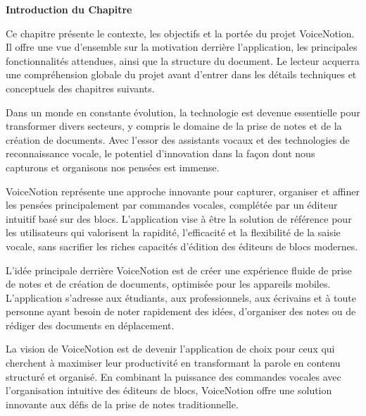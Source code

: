 
\begin{center}
\textbf{\large Introduction du Chapitre}
\end{center}

\noindent
Ce chapitre présente le contexte, les objectifs et la portée du projet VoiceNotion. Il offre une vue d'ensemble sur la motivation derrière l'application, les principales fonctionnalités attendues, ainsi que la structure du document. Le lecteur acquerra une compréhension globale du projet avant d'entrer dans les détails techniques et conceptuels des chapitres suivants.

\thispagestyle{fancy}

\vspace{1cm}

Dans un monde en constante évolution, la technologie est devenue essentielle pour transformer divers secteurs, y compris le domaine de la prise de notes et de la création de documents. Avec l'essor des assistants vocaux et des technologies de reconnaissance vocale, le potentiel d'innovation dans la façon dont nous capturons et organisons nos pensées est immense.

VoiceNotion représente une approche innovante pour capturer, organiser et affiner les pensées principalement par commandes vocales, complétée par un éditeur intuitif basé sur des blocs. L'application vise à être la solution de référence pour les utilisateurs qui valorisent la rapidité, l'efficacité et la flexibilité de la saisie vocale, sans sacrifier les riches capacités d'édition des éditeurs de blocs modernes.

\vspace{0.5cm}

L'idée principale derrière VoiceNotion est de créer une expérience fluide de prise de notes et de création de documents, optimisée pour les appareils mobiles. L'application s'adresse aux étudiants, aux professionnels, aux écrivains et à toute personne ayant besoin de noter rapidement des idées, d'organiser des notes ou de rédiger des documents en déplacement.

\vspace{0.5cm}

La vision de VoiceNotion est de devenir l'application de choix pour ceux qui cherchent à maximiser leur productivité en transformant la parole en contenu structuré et organisé. En combinant la puissance des commandes vocales avec l'organisation intuitive des éditeurs de blocs, VoiceNotion offre une solution innovante aux défis de la prise de notes traditionnelle.


